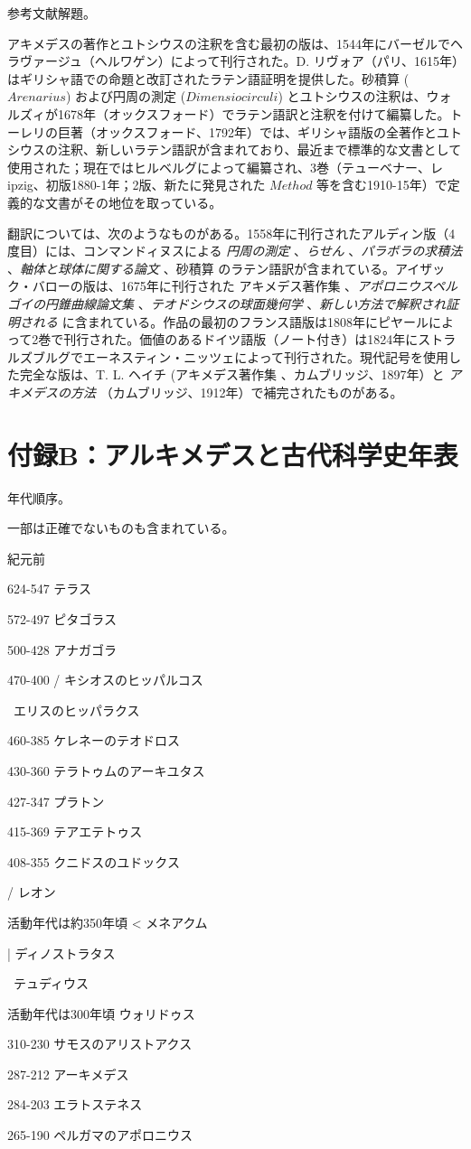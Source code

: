 \documentclass[a4paper,11pt,openany]{ltjsbook}
\begin{document}
参考文献解題。

アキメデスの著作とユトシウスの注釈を含む最初の版は、1544年にバーゼルでヘラヴァージュ（ヘルワゲン）によって刊行された。D. リヴォア（パリ、1615年）はギリシャ語での命題と改訂されたラテン語証明を提供した。砂積算 ($Arenarius$) および円周の測定 ($Dimensio circuli$) とユトシウスの注釈は、ウォルズィが1678年（オックスフォード）でラテン語訳と注釈を付けて編纂した。トーレリの巨著（オックスフォード、1792年）では、ギリシャ語版の全著作とユトシウスの注釈、新しいラテン語訳が含まれており、最近まで標準的な文書として使用された；現在ではヒルベルグによって編纂され、3巻（テューベナー、レipzig、初版1880-1年；2版、新たに発見された $Method$ 等を含む1910-15年）で定義的な文書がその地位を取っている。

翻訳については、次のようなものがある。1558年に刊行されたアルディン版（4度目）には、コンマンドィヌスによる \textit{円周の測定} 、\textit{らせん} 、\textit{パラボラの求積法} 、\textit{軸体と球体に関する論文} 、$砂積算$ のラテン語訳が含まれている。アイザック・バローの版は、1675年に刊行された $アキメデス著作集$ 、\textit{アポロニウスペルゴイの円錐曲線論文集} 、\textit{テオドシウスの球面幾何学} 、\textit{新しい方法で解釈され証明される} に含まれている。作品の最初のフランス語版は1808年にピヤールによって2巻で刊行された。価値のあるドイツ語版（ノート付き）は1824年にストラルズブルグでエーネスティン・ニッツェによって刊行された。現代記号を使用した完全な版は、T. L. ヘイチ ($アキメデス著作集$ 、カムブリッジ、1897年）と \textit{アキメデスの方法} （カムブリッジ、1912年）で補完されたものがある。

\clearpage

\chapter*{付録B：アルキメデスと古代科学史年表}

年代順序。

一部は正確でないものも含まれている。

紀元前

624-547  テラス

572-497  ピタゴラス

500-428  アナガゴラ

470-400  / キシオスのヒッパルコス

\ エリスのヒッパラクス

460-385  ケレネーのテオドロス

430-360  テラトゥムのアーキユタス

427-347  プラトン

415-369  テアエテトゥス

408-355  クニドスのユドックス

/ レオン

活動年代は約350年頃 < メネアクム

| ディノストラタス

\ テュディウス

活動年代は300年頃    ウォリドゥス

310-230    サモスのアリストアクス

287-212    アーキメデス

284-203    エラトステネス

265-190    ペルガマのアポロニウス

\clearpage
\end{document}
